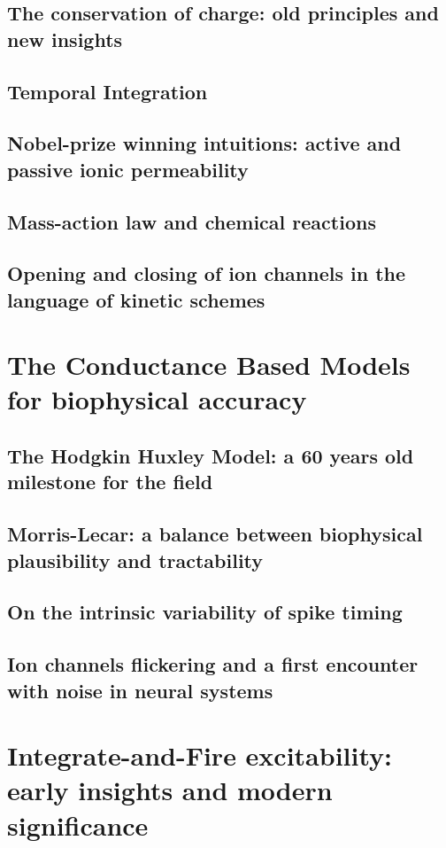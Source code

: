 \subsection{The conservation of charge: old principles and new insights}

\subsection{Temporal Integration}

\subsection{Nobel-prize winning intuitions: active and passive ionic permeability}

\subsection{Mass-action law and chemical reactions}
\subsection{Opening and closing of ion channels in the language of kinetic schemes}




\section{The Conductance Based Models for biophysical accuracy}\label{sec3:2}
\subsection{The Hodgkin Huxley Model: a 60 years old milestone for the field}
\subsection{Morris-Lecar: a balance between biophysical plausibility and tractability}
\subsection{On the intrinsic variability of spike timing}
\subsection{Ion channels flickering and a first encounter with noise in neural systems}

\section{Integrate-and-Fire excitability: early insights and modern significance}\label{sec3:3}

